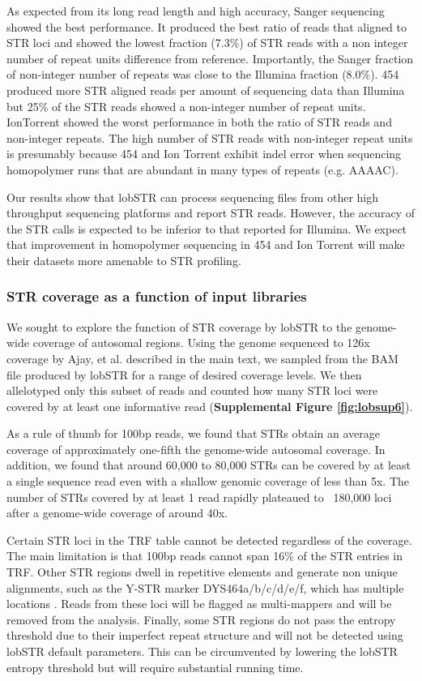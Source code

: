 {As expected from its long read length and high accuracy, Sanger sequencing showed the best performance. It produced the best ratio of reads that aligned to STR loci and showed the lowest fraction (7.3\%) of STR reads with a non integer number of repeat units difference from reference. Importantly, the Sanger fraction of non-integer number of repeats was close to the Illumina fraction (8.0\%). 454 produced more STR aligned reads per amount of sequencing data than Illumina but 25\% of the STR reads showed a non-integer number of repeat units. IonTorrent showed the worst performance in both the ratio of STR reads and non-integer repeats.  The high number of STR reads with non-integer repeat units is presumably because 454 and Ion Torrent exhibit indel error when sequencing homopolymer runs that are abundant in many types of repeats (e.g. AAAAC).

Our results show that lobSTR can process sequencing files from other high throughput sequencing platforms and report STR reads. However, the accuracy of the STR calls is expected to be inferior to that reported for Illumina. We expect that improvement in homopolymer sequencing in 454 and Ion Torrent will make their datasets more amenable to STR profiling. 

\subsubsection{STR coverage as a function of input libraries}
We sought to explore the function of STR coverage by lobSTR to the genome-wide coverage of autosomal regions. Using the genome sequenced to 126x coverage by Ajay, et al. \cite{AjayParkerAbaanEtAl2011} described in the main text, we sampled from the BAM file produced by lobSTR for a range of desired coverage levels. We then allelotyped only this subset of reads and counted how many STR loci were covered by at least one informative read (\textbf{Supplemental Figure \ref{fig:lobsup6}}).

As a rule of thumb for 100bp reads, we found that STRs obtain an average coverage of approximately one-fifth the genome-wide autosomal coverage. In addition, we found that around 60,000 to 80,000 STRs can be covered by at least a single sequence read even with a shallow genomic coverage of less than 5x. The number of STRs covered by at least 1 read rapidly plateaued to ~180,000 loci after a genome-wide coverage of around 40x. 

Certain STR loci in the TRF table cannot be detected regardless of the coverage. The main limitation is that 100bp reads cannot span 16\% of the STR entries in TRF. Other STR regions dwell in repetitive elements and generate non unique alignments, such as the Y-STR marker DYS464a/b/c/d/e/f, which has multiple locations \cite{KehdyPena2010}. Reads from these loci will be flagged as multi-mappers and will be removed from the analysis. Finally, some STR regions do not pass the entropy threshold due to their imperfect repeat structure and will not be detected using lobSTR default parameters. This can be circumvented by lowering the lobSTR entropy threshold but will require substantial running time.

}
